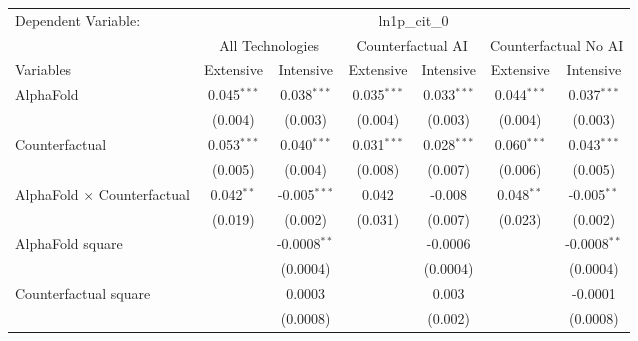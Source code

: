 \begingroup
\centering
\begin{tabular}{lcccccc}
   \tabularnewline \midrule \midrule
   Dependent Variable: & \multicolumn{6}{c}{ln1p\_cit\_0}\\
 & \multicolumn{2}{c}{All Technologies} & \multicolumn{2}{c}{Counterfactual AI} & \multicolumn{2}{c}{Counterfactual No AI} \\
\cmidrule(lr){1-1}\cmidrule(lr){2-3} \cmidrule(lr){4-5} \cmidrule(lr){6-7}
Variables & \multicolumn{1}{c}{Extensive} & \multicolumn{1}{c}{Intensive} & \multicolumn{1}{c}{Extensive} & \multicolumn{1}{c}{Intensive} & \multicolumn{1}{c}{Extensive} & \multicolumn{1}{c}{Intensive} \\
\cmidrule(lr){1-1}\cmidrule(lr){2-2} \cmidrule(lr){3-3} \cmidrule(lr){4-4} \cmidrule(lr){5-5} \cmidrule(lr){6-6} \cmidrule(lr){7-7}
   AlphaFold                          & 0.045$^{***}$ & 0.038$^{***}$  & 0.035$^{***}$ & 0.033$^{***}$ & 0.044$^{***}$ & 0.037$^{***}$\\   
                                      & (0.004)       & (0.003)        & (0.004)       & (0.003)       & (0.004)       & (0.003)\\   
   Counterfactual                     & 0.053$^{***}$ & 0.040$^{***}$  & 0.031$^{***}$ & 0.028$^{***}$ & 0.060$^{***}$ & 0.043$^{***}$\\   
                                      & (0.005)       & (0.004)        & (0.008)       & (0.007)       & (0.006)       & (0.005)\\   
   AlphaFold $\times$ Counterfactual  & 0.042$^{**}$  & -0.005$^{***}$ & 0.042         & -0.008        & 0.048$^{**}$  & -0.005$^{**}$\\   
                                      & (0.019)       & (0.002)        & (0.031)       & (0.007)       & (0.023)       & (0.002)\\   
   AlphaFold square                   &               & -0.0008$^{**}$ &               & -0.0006       &               & -0.0008$^{**}$\\   
                                      &               & (0.0004)       &               & (0.0004)      &               & (0.0004)\\   
   Counterfactual square              &               & 0.0003         &               & 0.003         &               & -0.0001\\   
                                      &               & (0.0008)       &               & (0.002)       &               & (0.0008)\\   

\end{tabular}
